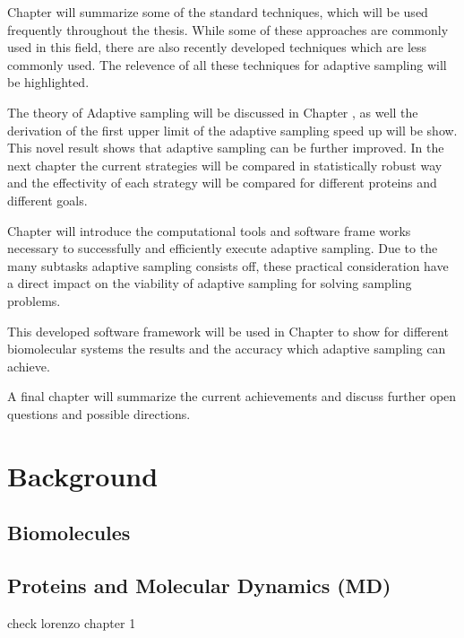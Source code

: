 Chapter \label{sec:background} will summarize some of the standard techniques, which will be used frequently throughout the thesis. While some of these approaches are commonly used in this field, there are also recently developed techniques which are less commonly used. The relevence of all these techniques for adaptive sampling will be highlighted. 

The theory of Adaptive sampling will be discussed in Chapter \label{ch:chapter3}, as well the derivation of the first upper limit of the adaptive sampling speed up will be show. This novel result shows that adaptive sampling can be further improved. 
In the next chapter \label{ch:chapter32} the current strategies will be compared in statistically robust way and the effectivity of each strategy will be compared for different proteins and different goals.

Chapter \label{ch:chapter4} will introduce the computational tools and software frame works necessary to successfully and efficiently execute adaptive sampling. Due to the many subtasks adaptive sampling consists off, these practical consideration have a direct impact on the viability of adaptive sampling for solving sampling problems.

This developed software framework will be used in Chapter \label{ch:chapter5} to show for different biomolecular systems the results and the accuracy which adaptive sampling can achieve. 

A final chapter \label{ch:conclude} will summarize the current achievements and discuss further open questions and possible directions.


\afterpage{\null\newpage}
\chapter{Background\label{sec:background}}

\section{Biomolecules}



\section{Proteins and Molecular Dynamics (MD)}
\label{sec:MD}
check lorenzo chapter 1

